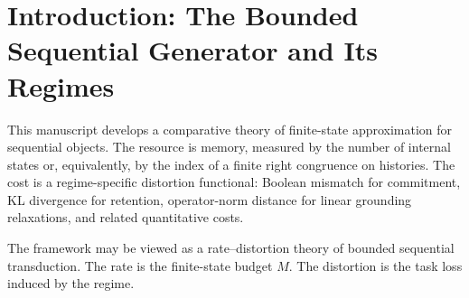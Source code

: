 \documentclass[12pt]{article}
\theoremstyle{definition}
\begin{document}
\begin{abstract}
A conditional Schatten template states that a rank-controlled response
operator together with a Schatten-$p$ domination inequality yields a
Schatten-$p$ tail lower bound.  An oracle inequality composes offline
approximation and online estimation within type-correct hypothesis classes.
A conditional continuous bias--variance sandwich is proved for regular
approximation and estimation envelopes, and, under the explicit approximation
and estimation floors of Assumption~\ref{ass:oracle-floors}, a matching
minimax lower bound is proved, so the envelope is optimal up to the
aggregation penalty.  Whether that penalty is itself necessary remains open.

A linear second-order safety surrogate based on pinching satisfies Ky Fan
majorization and is distinct from the discrete right-congruence Price of
Safety.  A vertex correspondence labels retention by $\alpha=1$, commitment by
a Booleanized symmetrized $\alpha=0$ support vertex, and grounding by an
$\alpha=\infty$ operator-norm face; this is an organizing analogy, recorded as
a formal consistency rather than a derivation, and none of the analytic
theorems depend on it.  Every approximation claim carries an explicit type
signature fixing regime, feasible set, aggregation, support, protocol, and
analytical bridge, so that statements from different regimes are not
conflated.  The framework separates shared finite-state syntax from
regime-specific analysis and identifies the remaining open problem of exact
symbolic deterministic grounding.
\end{abstract}
\tableofcontents

\section{Introduction: The Bounded Sequential Generator and Its Regimes}
\label{sec:intro}

This manuscript develops a comparative theory of finite-state approximation
for sequential objects.  The resource is memory, measured by the number of
internal states or, equivalently, by the index of a finite right congruence on
histories.  The cost is a regime-specific distortion functional: Boolean
mismatch for commitment, KL divergence for retention, operator-norm distance
for linear grounding relaxations, and related quantitative costs.

The framework may be viewed as a rate--distortion theory of bounded sequential
transduction.  The rate is the finite-state budget $M$.  The distortion is the
task loss induced by the regime.
\end{document}
